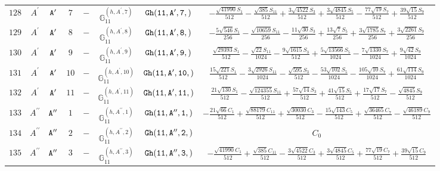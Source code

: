 \documentclass[fleqn,8pt]{jsarticle}
\begin{document}
\begin{table}[ht!]
\begin{center}
\begin{tabular}{cccccccc}
$ 128 $ & $ A^{\prime} $ & $ {\tt A'} $ & $ 7 $ & $ - $ & $ \mathbb{G}_{11}^{(h,A^{\prime},7)} $ & $ {\tt Gh(11,A',7,)} $ & $ - \frac{\sqrt{41990} S_{1}}{512} - \frac{\sqrt{385} S_{11}}{512} + \frac{3 \sqrt{4522} S_{3}}{512} + \frac{3 \sqrt{4845} S_{5}}{512} - \frac{77 \sqrt{19} S_{7}}{512} + \frac{39 \sqrt{15} S_{9}}{512} $ \\
$ 129 $ & $ A^{\prime} $ & $ {\tt A'} $ & $ 8 $ & $ - $ & $ \mathbb{G}_{11}^{(h,A^{\prime},8)} $ & $ {\tt Gh(11,A',8,)} $ & $ - \frac{5 \sqrt{546} S_{1}}{256} - \frac{\sqrt{10659} S_{11}}{256} - \frac{11 \sqrt{30} S_{3}}{256} + \frac{13 \sqrt{7} S_{5}}{256} + \frac{3 \sqrt{1785} S_{7}}{256} + \frac{3 \sqrt{2261} S_{9}}{256} $ \\
$ 130 $ & $ A^{\prime} $ & $ {\tt A'} $ & $ 9 $ & $ - $ & $ \mathbb{G}_{11}^{(h,A^{\prime},9)} $ & $ {\tt Gh(11,A',9,)} $ & $ \frac{\sqrt{29393} S_{1}}{512} - \frac{\sqrt{22} S_{11}}{1024} - \frac{9 \sqrt{1615} S_{3}}{512} + \frac{5 \sqrt{13566} S_{5}}{1024} - \frac{7 \sqrt{1330} S_{7}}{1024} + \frac{9 \sqrt{42} S_{9}}{1024} $ \\
$ 131 $ & $ A^{\prime} $ & $ {\tt A'} $ & $ 10 $ & $ - $ & $ \mathbb{G}_{11}^{(h,A^{\prime},10)} $ & $ {\tt Gh(11,A',10,)} $ & $ \frac{15 \sqrt{221} S_{1}}{512} - \frac{3 \sqrt{2926} S_{11}}{1024} - \frac{\sqrt{595} S_{3}}{512} - \frac{53 \sqrt{102} S_{5}}{1024} - \frac{105 \sqrt{10} S_{7}}{1024} + \frac{61 \sqrt{114} S_{9}}{1024} $ \\
$ 132 $ & $ A^{\prime} $ & $ {\tt A'} $ & $ 11 $ & $ - $ & $ \mathbb{G}_{11}^{(h,A^{\prime},11)} $ & $ {\tt Gh(11,A',11,)} $ & $ \frac{21 \sqrt{130} S_{1}}{512} - \frac{\sqrt{124355} S_{11}}{512} + \frac{57 \sqrt{14} S_{3}}{512} + \frac{41 \sqrt{15} S_{5}}{512} + \frac{17 \sqrt{17} S_{7}}{512} - \frac{\sqrt{4845} S_{9}}{512} $ \\
$ 133 $ & $ A^{\prime\prime} $ & $ {\tt A''} $ & $ 1 $ & $ - $ & $ \mathbb{G}_{11}^{(h,A^{\prime\prime},1)} $ & $ {\tt Gh(11,A'',1,)} $ & $ - \frac{21 \sqrt{66} C_{1}}{512} + \frac{\sqrt{88179} C_{11}}{512} + \frac{\sqrt{30030} C_{3}}{512} - \frac{15 \sqrt{143} C_{5}}{512} + \frac{\sqrt{36465} C_{7}}{512} - \frac{\sqrt{46189} C_{9}}{512} $ \\
$ 134 $ & $ A^{\prime\prime} $ & $ {\tt A''} $ & $ 2 $ & $ - $ & $ \mathbb{G}_{11}^{(h,A^{\prime\prime},2)} $ & $ {\tt Gh(11,A'',2,)} $ & $ C_{0} $ \\
$ 135 $ & $ A^{\prime\prime} $ & $ {\tt A''} $ & $ 3 $ & $ - $ & $ \mathbb{G}_{11}^{(h,A^{\prime\prime},3)} $ & $ {\tt Gh(11,A'',3,)} $ & $ - \frac{\sqrt{41990} C_{1}}{512} + \frac{\sqrt{385} C_{11}}{512} - \frac{3 \sqrt{4522} C_{3}}{512} + \frac{3 \sqrt{4845} C_{5}}{512} + \frac{77 \sqrt{19} C_{7}}{512} + \frac{39 \sqrt{15} C_{9}}{512} $ \\

\end{tabular}
\end{center}
\end{table}
\end{document}
